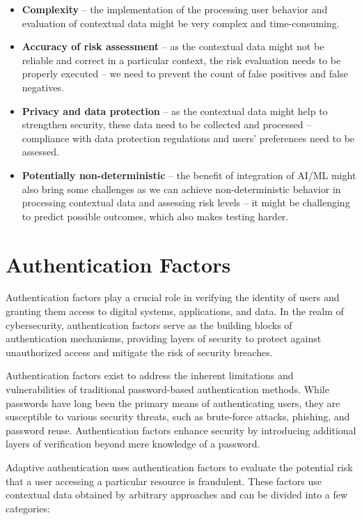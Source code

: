 \begin{itemize}
    \item \textbf{Complexity} -- the implementation of the processing user behavior and evaluation of contextual data might be very complex and time-consuming.  
    \item \textbf{Accuracy of risk assessment} -- as the contextual data might not be reliable and correct in a particular context, the risk evaluation needs to be properly executed -- we need to prevent the count of false positives and false negatives. 
    \item \textbf{Privacy and data protection} -- as the contextual data might help to strengthen security, these data need to be collected and processed -- compliance with data protection regulations and users' preferences need to be assessed.
    \item \textbf{Potentially non-deterministic} -- the benefit of integration of AI/ML might also bring some challenges as we can achieve non-deterministic behavior in processing contextual data and assessing risk levels -- it might be challenging to predict possible outcomes, which also makes testing harder.\cite{intro-logintc}\cite{intro-silverfort}\cite{intro-descope}
    
\end{itemize}

\newpage
\section{Authentication Factors} \label{authentication-factors}
Authentication factors play a crucial role in verifying the identity of users and granting them access to digital systems, applications, and data.
In the realm of cybersecurity, authentication factors serve as the building blocks of authentication mechanisms, providing layers of security to protect against unauthorized access and mitigate the risk of security breaches.

Authentication factors exist to address the inherent limitations and vulnerabilities of traditional password-based authentication methods.
While passwords have long been the primary means of authenticating users, they are susceptible to various security threats, such as brute-force attacks, phishing, and password reuse.
Authentication factors enhance security by introducing additional layers of verification beyond mere knowledge of a password.\cite{auth-factors-aratek}

Adaptive authentication uses authentication factors to evaluate the potential risk that a user accessing a particular resource is fraudulent.
\newline
\newline
These factors use contextual data obtained by arbitrary approaches and can be divided into a few categories:


